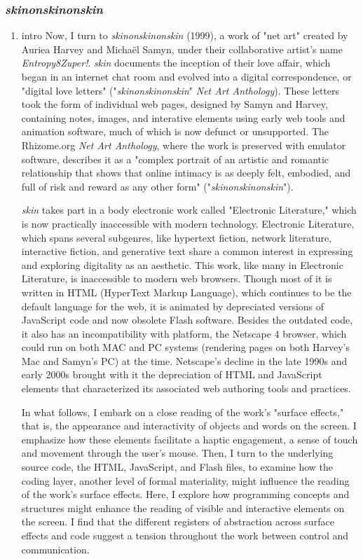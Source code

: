 \documentclass[11pt]{article}
\begin{document}
\subsubsection{\emph{skinonskinonskin}}
\label{sec:orga48cd0f}
\begin{enumerate}
\item intro
\label{sec:orgd621d33}
Now, I turn to \emph{skinonskinonskin} (1999), a work of "net art" created
by Auriea Harvey and Michaël Samyn, under their collaborative artist's
name \emph{Entropy8Zuper!}. \emph{skin} documents the inception of their love
affair, which began in an internet chat room and evolved into a
digital correspondence, or "digital love letters"
("\emph{skinonskinonskin}" \emph{Net Art Anthology}). These letters took the
form of individual web pages, designed by Samyn and Harvey, containing
notes, images, and interative elements using early web tools and
animation software, much of which is now defunct or unsupported. The
Rhizome.org \emph{Net Art Anthology}, where the work is preserved with
emulator software, describes it as a "complex portrait of an artistic
and romantic relationship that shows that online intimacy is as deeply
felt, embodied, and full of risk and reward as any other form"
("\emph{skinonskinonskin}").

\emph{skin} takes part in a body electronic work called "Electronic
Literature," which is now practically inaccessible with modern
technology. Electronic Literature, which spans several subgenres, like
hypertext fiction, network literature, interactive fiction, and
generative text share a common interest in expressing and exploring
digitality as an aesthetic. This work, like many in Electronic
Literature, is inaccessible to modern web browsers. Though most of it
is written in HTML (HyperText Markup Language), which continues to be
the default language for the web, it is animated by depreciated
versions of JavaScript code and now obsolete Flash software. Besides
the outdated code, it also has an incompatibility with platform, the
Netscape 4 browser, which could run on both MAC and PC systems
(rendering pages on both Harvey's Mac and Samyn's PC) at the
time. Netscape's decline in the late 1990s and early 2000s brought
with it the depreciation of HTML and JavaScript elements that
characterized its associated web authoring tools and practices.

In what follows, I embark on a close reading of the work's "surface
effects," that is, the appearance and interactivity of objects and
words on the screen. I emphasize how these elements facilitate a
haptic engagement, a sense of touch and movement through the user's
mouse. Then, I turn to the underlying source code, the HTML,
JavaScript, and Flash files, to examine how the coding layer, another
level of formal materiality, might influence the reading of the work's
surface effects. Here, I explore how programming concepts and
structures might enhance the reading of visible and interactive
elements on the screen. I find that the different registers of
abstraction across surface effects and code suggest a tension
throughout the work between control and communication.


\end{enumerate}
\end{document}
